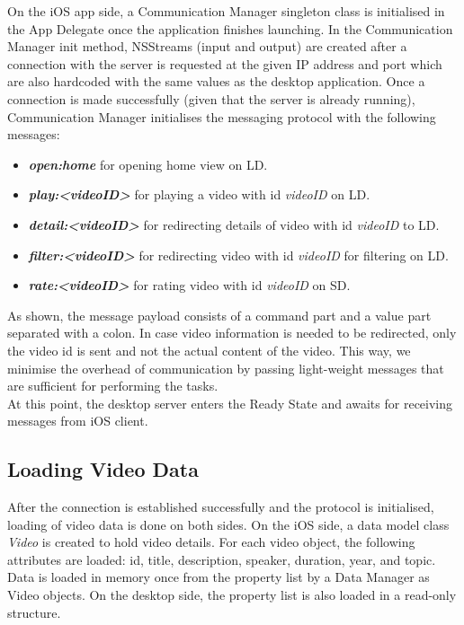 On the iOS app side, a Communication Manager singleton class is initialised in the App Delegate once the application finishes launching. In the Communication Manager init method, NSStreams (input and output) are created after a connection with the server is requested at the given IP address and port which are also hardcoded with the same values as the desktop application. Once a connection is made successfully (given that the server is already running), Communication Manager initialises the messaging protocol with the following messages:
\begin{itemize}
	\item \textbf{\textit{open:home}} for opening home view on LD. 
	\item \textbf{\textit{play:<videoID>}} for playing a video with id \textit{videoID} on LD.
	\item \textbf{\textit{detail:<videoID>}} for redirecting details of video with id \textit{videoID} to LD.
	\item \textbf{\textit{filter:<videoID>}} for redirecting video with id \textit{videoID} for filtering on LD.
	\item \textbf{\textit{rate:<videoID>}} for rating video with id \textit{videoID} on SD.
\end{itemize}
As shown, the message payload consists of a command part and a value part separated with a colon. In case video information is needed to be redirected, only the video id is sent and not the actual content of the video. This way, we minimise the overhead of communication by passing light-weight messages that are sufficient for performing the tasks.\\
At this point, the desktop server enters the Ready State and awaits for receiving messages from iOS client.

\subsection{Loading Video Data}
After the connection is established successfully and the protocol is initialised, loading of video data is done on both sides. On the iOS side, a data model class \textit{Video} is created to hold video details. For each video object, the following attributes are loaded: id, title, description, speaker, duration, year, and topic.
Data is loaded in memory once from the property list by a Data Manager as Video objects. On the desktop side, the property list is also loaded in a read-only structure.       
